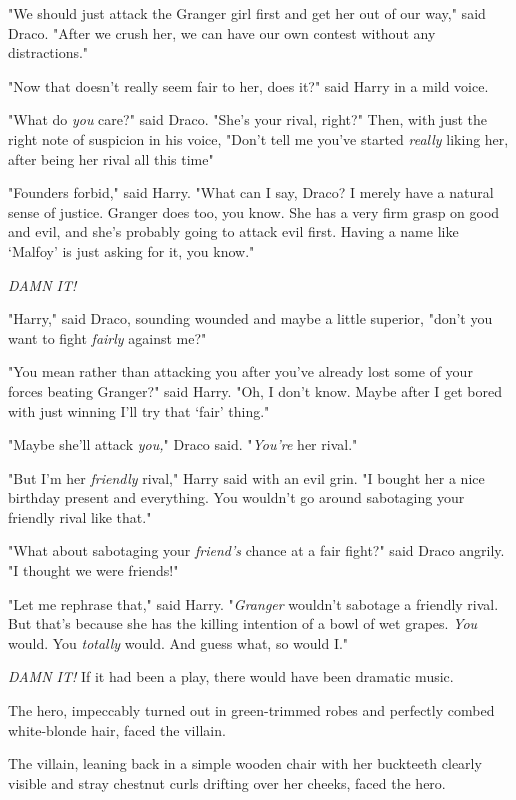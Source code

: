 "We should just attack the Granger girl first and get her out of our way," said
Draco. "After we crush her, we can have our own contest without any
distractions."

"Now that doesn't really seem fair to her, does it?" said Harry in a mild voice.

"What do \emph{you} care?" said Draco. "She's your rival, right?" Then, with
just the right note of suspicion in his voice, "Don't tell me you've started
\emph{really} liking her, after being her rival all this time{\el}"

"Founders forbid," said Harry. "What can I say, Draco? I merely have a natural
sense of justice. Granger does too, you know. She has a very firm grasp on good
and evil, and she's probably going to attack evil first. Having a name like
`Malfoy' is just asking for it, you know."

\emph{DAMN IT!}

"Harry," said Draco, sounding wounded and maybe a little superior, "don't you
want to fight \emph{fairly} against me?"

"You mean rather than attacking you after you've already lost some of your
forces beating Granger?" said Harry. "Oh, I don't know. Maybe after I get bored
with just winning I'll try that `fair' thing."

"Maybe she'll attack \emph{you,}" Draco said. "\emph{You're} her rival."

"But I'm her \emph{friendly} rival," Harry said with an evil grin. "I bought
her a nice birthday present and everything. You wouldn't go around sabotaging
your friendly rival like that."

"What about sabotaging your \emph{friend's} chance at a fair fight?" said Draco
angrily. "I thought we were friends!"

"Let me rephrase that," said Harry. "\emph{Granger} wouldn't sabotage a
friendly rival. But that's because she has the killing intention of a bowl of
wet grapes. \emph{You} would. You \emph{totally} would. And guess what, so
would I."

\emph{DAMN IT!}
\sbreak
If it had been a play, there would have been dramatic music.

The hero, impeccably turned out in green-trimmed robes and perfectly combed
white-blonde hair, faced the villain.

The villain, leaning back in a simple wooden chair with her buckteeth clearly
visible and stray chestnut curls drifting over her cheeks, faced the hero.

